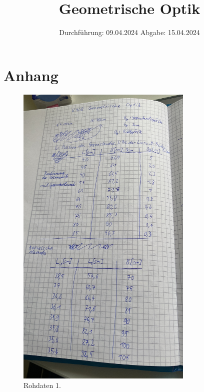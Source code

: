 

\subject{V408}
\title{Geometrische Optik}
\date{%
  Durchführung: 09.04.2024
  \hspace{3em}
  Abgabe: 15.04.2024
}



\maketitle
\thispagestyle{empty}
\tableofcontents
\newpage
 






\printbibliography{}

\section{Anhang}

\begin{figure}[H]
  \includegraphics[width=\textwidth, height=15cm, angle=270]{Bilder/Messdaten1.JPG}
  \caption{Rohdaten 1.}
\end{figure}

